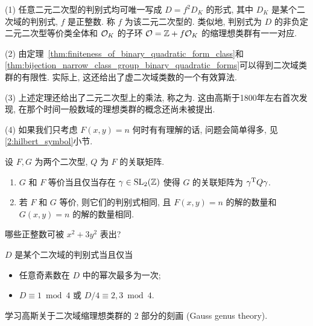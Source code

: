 \begin{remark}
(1) 任意二元二次型的判别式均可唯一写成 $D=f^2D_K$ 的形式, 其中 $D_K$ 是某个二次域的判别式, $f$ 是正整数. 称 $f$ 为该二元二次型的. 类似地, 判别式为 $D$ 的非负定二元二次型等价类全体和 ${\mathcal{O}}_K$ 的子环 ${\mathcal{O}}={\mathbb{Z}}+f{\mathcal{O}}_K$ 的缩理想类群有一一对应.

(2) 由定理~\ref{thm:finiteness_of_binary_quadratic_form_class}和\ref{thm:bijection_narrow_class_group_binary_quadratic_forms}可以得到二次域类群的有限性. 实际上, 这还给出了虚二次域类数的一个有效算法.

(3) 上述定理还给出了二元二次型上的乘法, 称之为. 这由高斯于1800年左右首次发现, 在那个时间一般数域的理想类群的概念还尚未被提出.

(4) 如果我们只考虑 $F(x,y)=n$ 何时有有理解的话, 问题会简单得多, 见\ref{2:hilbert_symbol}小节.
\end{remark}


\begin{exercise}
设 $F,G$ 为两个二次型, $Q$ 为 $F$ 的关联矩阵.
\begin{enumerate}
	\item $G$ 和 $F$ 等价当且仅当存在 $\gamma\in{\mathrm{SL}}_2({\mathbb{Z}})$ 使得 $G$ 的关联矩阵为 $\gamma^{\mathrm{T}} Q\gamma$.
	\item 若 $F$ 和 $G$ 等价, 则它们的判别式相同, 且 $F(x,y)=n$ 的解的数量和 $G(x,y)=n$ 的解的数量相同.
\end{enumerate}
\end{exercise}

\begin{exercise}
哪些正整数可被 $x^2+3y^2$ 表出?
\end{exercise}

\begin{exercise}
$D$ 是某个二次域的判别式当且仅当
\begin{itemize}
\item 任意奇素数在 $D$ 中的幂次最多为一次;
\item $D\equiv 1\bmod 4$ 或 $D/4\equiv 2,3\bmod 4$.
\end{itemize}
\end{exercise}

\begin{exercise}
学习高斯关于二次域缩理想类群的 $2$ 部分的刻画 (Gauss genus theory).
\end{exercise}

